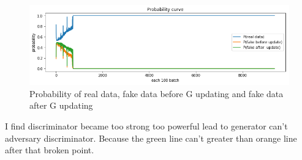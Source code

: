 \documentclass[12pt]{article}
\begin{document}
\begin{figure}[H]
\centering
\includegraphics[width=\linewidth]{Images/probbroken.png}
\caption{Probability of real data, fake data before G updating and fake data after G updating}
\end{figure}

I find discriminator became too strong too powerful lead to generator can't adversary discriminator. Because the green line can't greater than orange line after that broken point.


 
\end{document}
